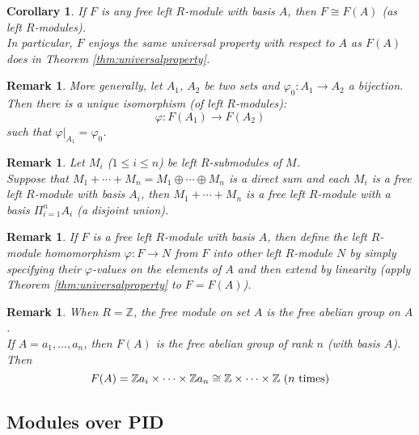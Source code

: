\documentclass[a4paper,8pt]{article}
\newcommand{\Z}{\mathbb{Z}}
\newcommand{\hlt}[1]{\textit{{\color{blue}#1}}}
\theoremstyle{theorem}
\newtheorem{corollary}[theorem]{Corollary}
\newtheorem{remark}[theorem]{Remark}
\begin{document}
\begin{corollary}
If $F$ is any free left $R$-module with basis $A$, then $F \cong F(A)$ (as left $R$-modules).\\
In particular, $F$ enjoys the same universal property with respect to $A$ as $F(A)$ does in Theorem \ref{thm:universalproperty}.
\end{corollary}

\begin{remark}
More generally, let $A_1$, $A_2$ be two sets and $\varphi_0 : A_1 \rightarrow A_2$ a bijection.\\
Then there is a unique isomorphism (of left $R$-modules):
\begin{equation}
\varphi: F(A_1) \rightarrow F(A_2) \nonumber
\end{equation}
such that $\varphi|_{A_1} = \varphi_0$.
\end{remark}

\begin{remark}
Let $M_i$ ($1 \leq i \leq n$) be left $R$-submodules of $M$.\\
Suppose that $M_1 + \cdots + M_n = M_1 \oplus \cdots \oplus M_n$ is a direct sum and each $M_i$ is a free left $R$-module with basis $A_i$, then $M_1 + \cdots + M_n$ is a free left $R$-module with a basis $\Pi_{i=1}^n A_i$ (a disjoint union).
\end{remark}

\begin{remark}
If $F$ is a free left $R$-module with basis $A$, then define the left $R$-module homomorphism $\varphi: F \rightarrow N$ from $F$ into other left $R$-module $N$ by simply specifying their $\varphi$-values on the elements of $A$ and then extend by linearity (apply Theorem \ref{thm:universalproperty} to $F = F(A)$).
\end{remark}

\begin{remark}
When $R = \Z$, the free module on set $A$ is the \hlt{free abelian group on $A$}.\\
If $A={a_1, \ldots, a_n}$, then $F(A)$ is the free abelian group of rank $n$ (with basis $A$). Then
\begin{equation}
F(A) = \Z a_i \times \cdots \times \Z a_n \cong \Z \times \cdots \times \Z \ (n \textnormal{ times}) \nonumber
\end{equation}
\end{remark}

\subsection{Modules over PID}
\end{document}
